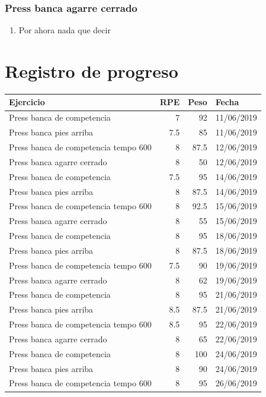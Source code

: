 \documentclass[11pt]{article}
\begin{document}
\subsubsection{Press banca agarre cerrado}
\label{sec:orgdd66944}
\begin{enumerate}
\item Por ahora nada que decir
\end{enumerate}
\section{Registro de progreso}
\label{sec:org0058da2}
\begin{center}
\label{tab:org77f1431}
\begin{tabular}{lrrl}
Ejercicio & RPE & Peso & Fecha\\
\hline
Press banca de competencia & 7 & 92 & 11/06/2019\\
Press banca pies arriba & 7.5 & 85 & 11/06/2019\\
Press banca de competencia tempo 600 & 8 & 87.5 & 12/06/2019\\
Press banca agarre cerrado & 8 & 50 & 12/06/2019\\
Press banca de competencia & 7.5 & 95 & 14/06/2019\\
Press banca pies arriba & 8 & 87.5 & 14/06/2019\\
Press banca de competencia tempo 600 & 8 & 92.5 & 15/06/2019\\
Press banca agarre cerrado & 8 & 55 & 15/06/2019\\
Press banca de competencia & 8 & 95 & 18/06/2019\\
Press banca pies arriba & 8 & 87.5 & 18/06/2019\\
Press banca de competencia tempo 600 & 7.5 & 90 & 19/06/2019\\
Press banca agarre cerrado & 8 & 62 & 19/06/2019\\
Press banca de competencia & 8 & 95 & 21/06/2019\\
Press banca pies arriba & 8.5 & 87.5 & 21/06/2019\\
Press banca de competencia tempo 600 & 8.5 & 95 & 22/06/2019\\
Press banca agarre cerrado & 8 & 65 & 22/06/2019\\
Press banca de competencia & 8 & 100 & 24/06/2019\\
Press banca pies arriba & 8 & 90 & 24/06/2019\\
Press banca de competencia tempo 600 & 8 & 95 & 26/06/2019\\

\end{tabular}
\end{center}
\end{document}
